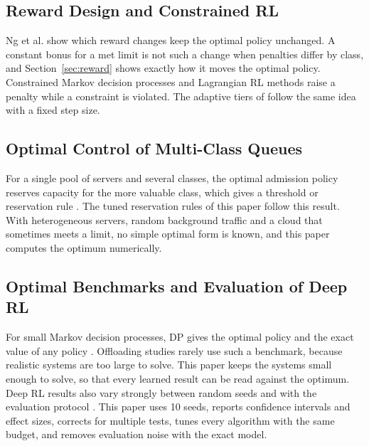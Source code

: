 \subsection{Reward Design and Constrained RL}
Ng et al. \cite{ng1999} show which reward changes keep the optimal policy unchanged. A constant bonus for a met limit is not such a change when penalties differ by class, and Section~\ref{sec:reward} shows exactly how it moves the optimal policy. Constrained Markov decision processes \cite{altman1999} and Lagrangian RL methods \cite{tessler2019} raise a penalty while a constraint is violated. The adaptive tiers of \cite{yamsani2026} follow the same idea with a fixed step size.

\subsection{Optimal Control of Multi-Class Queues}
For a single pool of servers and several classes, the optimal admission policy reserves capacity for the more valuable class, which gives a threshold or reservation rule \cite{miller1969}. The tuned reservation rules of this paper follow this result. With heterogeneous servers, random background traffic and a cloud that sometimes meets a limit, no simple optimal form is known, and this paper computes the optimum numerically.

\subsection{Optimal Benchmarks and Evaluation of Deep RL}
For small Markov decision processes, DP gives the optimal policy and the exact value of any policy \cite{puterman1994,sutton2018}. Offloading studies rarely use such a benchmark, because realistic systems are too large to solve. This paper keeps the systems small enough to solve, so that every learned result can be read against the optimum. Deep RL results also vary strongly between random seeds and with the evaluation protocol \cite{henderson2018,agarwal2021}. This paper uses 10 seeds, reports confidence intervals and effect sizes, corrects for multiple tests, tunes every algorithm with the same budget, and removes evaluation noise with the exact model.
